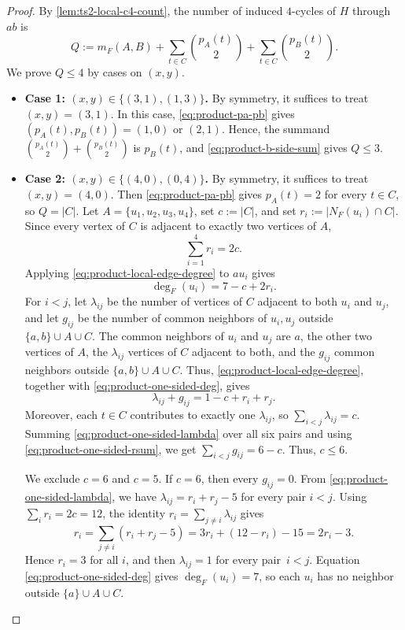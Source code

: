 \documentclass[a4paper]{article}
\theoremstyle{plain}
\theoremstyle{definition}
\numberwithin{equation}{section}
\begin{document}
\begin{proof}
By \cref{lem:ts2-local-c4-count}, the number of induced $4$-cycles of $H$ through $ab$ is
\begin{equation}
\label{eq:product-q-count}
Q:=m_F(A,B)+\sum_{t\in C}\binom{p_A(t)}2
+\sum_{t\in C}\binom{p_B(t)}2.
\end{equation}
We prove $Q\le 4$ by cases on $(x,y)$.

\begin{itemize}
\item \textbf{Case 1: $(x,y)\in\{(3,1),(1,3)\}$.}
By symmetry, it suffices to treat $(x,y)=(3,1)$.
In this case, \eqref{eq:product-pa-pb} gives $(p_A(t),p_B(t))=(1,0)$ or $(2,1)$.
Hence, the summand $\displaystyle \binom{p_A(t)}2+\binom{p_B(t)}2$ is $p_B(t)$, and \eqref{eq:product-b-side-sum} gives $Q\le 3$.

\item \textbf{Case 2: $(x,y)\in\{(4,0),(0,4)\}$.}
By symmetry, it suffices to treat $(x,y)=(4,0)$.
Then \eqref{eq:product-pa-pb} gives $p_A(t)=2$ for every $t\in C$, so $Q=|C|$.
Let $A=\{u_1,u_2,u_3,u_4\}$, set $c:=|C|$, and set $r_i:=|N_F(u_i)\cap C|$.
Since every vertex of $C$ is adjacent to exactly two vertices of $A$,
\begin{equation}
\label{eq:product-one-sided-rsum}
\sum_{i=1}^4 r_i=2c.
\end{equation}
Applying \eqref{eq:product-local-edge-degree} to $au_i$ gives
\begin{equation}
\label{eq:product-one-sided-deg}
\deg_F(u_i)=7-c+2r_i.
\end{equation}
For $i<j$, let $\lambda_{ij}$ be the number of vertices of $C$ adjacent to both $u_i$ and $u_j$, and let $g_{ij}$ be the number of common neighbors of $u_i,u_j$ outside $\{a,b\}\cup A\cup C$.
The common neighbors of $u_i$ and $u_j$ are $a$, the other two vertices of $A$, the $\lambda_{ij}$ vertices of $C$ adjacent to both, and the $g_{ij}$ common neighbors outside $\{a,b\}\cup A\cup C$.
Thus, \eqref{eq:product-local-edge-degree}, together with \eqref{eq:product-one-sided-deg}, gives
\begin{equation}
\label{eq:product-one-sided-lambda}
\lambda_{ij}+g_{ij}=1-c+r_i+r_j.
\end{equation}
Moreover, each $t\in C$ contributes to exactly one $\lambda_{ij}$, so $\displaystyle \sum_{i<j}\lambda_{ij}=c$.
Summing \eqref{eq:product-one-sided-lambda} over all six pairs and using \eqref{eq:product-one-sided-rsum}, we get $\displaystyle \sum_{i<j}g_{ij}=6-c$.
Thus, $c\le 6$.

We exclude $c=6$ and $c=5$.
If $c=6$, then every $g_{ij}=0$.
From \eqref{eq:product-one-sided-lambda}, we have $\lambda_{ij}=r_i+r_j-5$ for every pair $i<j$.
Using $\displaystyle \sum_i r_i=2c=12$, the identity $\displaystyle r_i=\sum_{j\ne i}\lambda_{ij}$ gives
\[
	r_i=\sum_{j\ne i}(r_i+r_j-5)=3r_i+(12-r_i)-15=2r_i-3.
\]
Hence $r_i=3$ for all $i$, and then $\lambda_{ij}=1$ for every pair~$i<j$.
Equation \eqref{eq:product-one-sided-deg} gives $\deg_F(u_i)=7$, so each $u_i$ has no neighbor outside $\{a\}\cup A\cup C$.


\end{itemize}
\end{proof}
\end{document}
